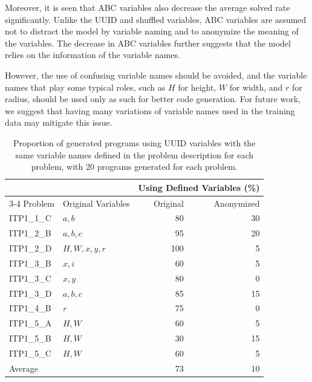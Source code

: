 \documentclass{article}
\begin{document}
Moreover, it is seen that ABC variables also decrease the average solved rate significantly.
Unlike the UUID and shuffled variables, ABC variables are assumed not to distract the model by variable naming and to anonymize the meaning of the variables.
The decrease in ABC variables further suggests that the model relies on the information of the variable names.

However, the use of confusing variable names should be avoided, and the variable names that play some typical roles, such as $H$ for height, $W$ for width, and $r$ for radius, should be used only as such for better code generation.
For future work, we suggest that having many variations of variable names used in the training data may mitigate this issue.





\begin{table}[ht]
\begin{center}
\begin{minipage}{0.68\linewidth}
    \caption{Proportion of generated programs using UUID variables with the same variable names defined in the problem description for each problem, with 20 programs generated for each problem.}
    \label{table:anonymized-variables-result}
    \begin{tabular*}{\linewidth}
    {llrr}
        \toprule
        & & \multicolumn{2}{c}{Using Defined Variables (\%)} \\
        \cmidrule{3-4}
        Problem & Original Variables & Original & Anonymized \\
        \midrule
        ITP1\_1\_C & $a, b$ & 80 & 30 \\
        ITP1\_2\_B & $a, b, c$ & 95 & 20 \\
        ITP1\_2\_D & $H, W, x, y, r$ & 100 & 5 \\
        ITP1\_3\_B & $x, i$ & 60 & 5 \\
        ITP1\_3\_C & $x, y$ & 80 & 0 \\
        ITP1\_3\_D & $a, b, c$ & 85 & 15 \\
        ITP1\_4\_B & $r$ & 75 & 0 \\
        ITP1\_5\_A & $H, W$ & 60 & 5 \\
        ITP1\_5\_B & $H, W$ & 30 & 15 \\
        ITP1\_5\_C & $H, W$ & 60 & 5 \\
        \midrule
        Average & & 73 & 10 \\
        \bottomrule
    \end{tabular*}
\end{minipage}
\end{center}
\end{table}
\end{document}
